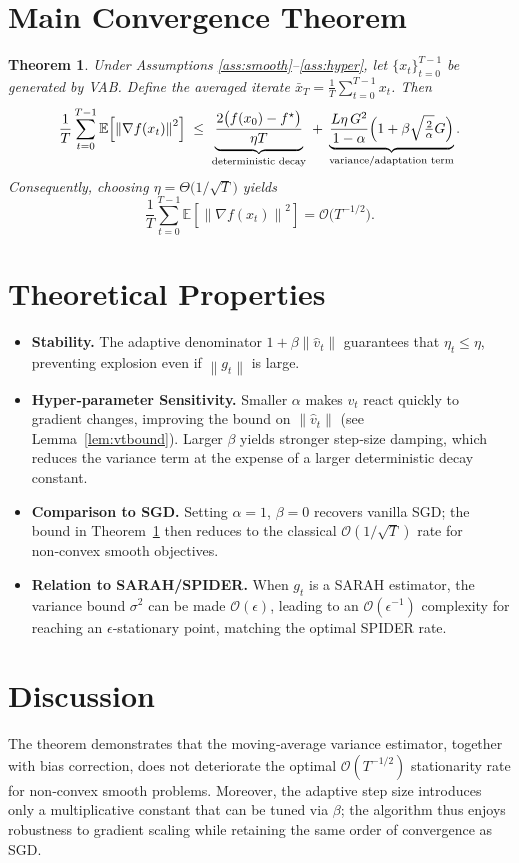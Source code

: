 \documentclass{article}
\newtheorem{theorem}{Theorem}
\newcommand{\EE}{\mathbb{E}}
\newcommand{\norm}[1]{\left\|#1\right\|}
\begin{document}
\section*{Main Convergence Theorem}
\begin{theorem}\label{thm:main}
Under Assumptions \ref{ass:smooth}–\ref{ass:hyper}, let $\{x_t\}_{t=0}^{T-1}$ be generated by VAB.
Define the averaged iterate $\bar x_T=\frac1T\sum_{t=0}^{T-1}x_t$.
Then
\[
\frac{1}{T}\sum_{t=0}^{T-1}\EE\!\left[\norm{\nabla f(x_t)}^2\right]
\;\le\;
\underbrace{\frac{2\bigl(f(x_0)-f^\star\bigr)}{\eta T}}_{\text{deterministic decay}}
\;+\;
\underbrace{ \frac{L\eta\,G^2}{1-\alpha}\Bigl(1+\beta\sqrt{\tfrac{2}{\alpha}}G\Bigr)}_{\text{variance/adaptation term}} .
\]
Consequently, choosing $\eta=\Theta\!\bigl(1/\sqrt{T}\bigr)$ yields
\[
\frac{1}{T}\sum_{t=0}^{T-1}\EE\!\left[\norm{\nabla f(x_t)}^2\right]=
\mathcal{O}\!\bigl(T^{-1/2}\bigr).
\]
\end{theorem}

\section*{Theoretical Properties}
\begin{itemize}
\item \textbf{Stability.} The adaptive denominator $1+\beta\norm{\hat v_t}$ guarantees that $\eta_t\le\eta$, preventing explosion even if $\norm{g_t}$ is large.
\item \textbf{Hyper‑parameter Sensitivity.} Smaller $\alpha$ makes $v_t$ react quickly to gradient changes, improving the bound on $\norm{\hat v_t}$ (see Lemma~\ref{lem:vtbound}). Larger $\beta$ yields stronger step‑size damping, which reduces the variance term at the expense of a larger deterministic decay constant.
\item \textbf{Comparison to SGD.} Setting $\alpha=1$, $\beta=0$ recovers vanilla SGD; the bound in Theorem~\ref{thm:main} then reduces to the classical $\mathcal{O}(1/\sqrt{T})$ rate for non‑convex smooth objectives.
\item \textbf{Relation to SARAH/SPIDER.} When $g_t$ is a SARAH estimator, the variance bound $\sigma^2$ can be made $\mathcal{O}(\epsilon)$, leading to an $\mathcal{O}(\epsilon^{-1})$ complexity for reaching an $\epsilon$‑stationary point, matching the optimal SPIDER rate.
\end{itemize}

\section*{Discussion}
The theorem demonstrates that the moving‑average variance estimator, together with bias correction, does not deteriorate the optimal $\mathcal{O}(T^{-1/2})$ stationarity rate for non‑convex smooth problems. Moreover, the adaptive step size introduces only a multiplicative constant that can be tuned via $\beta$; the algorithm thus enjoys robustness to gradient scaling while retaining the same order of convergence as SGD.
\end{document}
